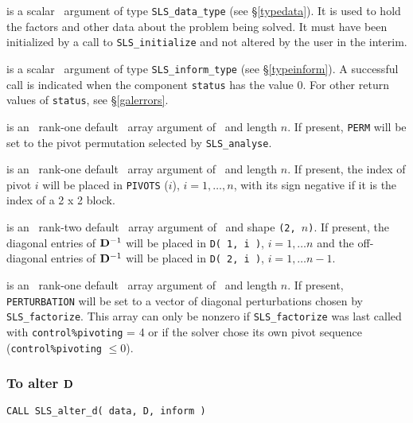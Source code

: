 \documentclass{galahad}
\newcommand{\packagename}{SLS}
\begin{document}
\begin{description}

 is a scalar \intentinout\ argument of type
{\tt \packagename\_data\_type}
(see \S\ref{typedata}). It is used to hold the factors and other
data about the problem being solved.
It must have been initialized by a call to
{\tt \packagename\_ini\-tialize} and not altered by the user in the interim.

 is a scalar \intentinout\ argument of type
{\tt \packagename\_inform\_type}
(see \S\ref{typeinform}).
A successful call is indicated when the  component {\tt status} has the value 0.
For other return values of {\tt status}, see \S\ref{galerrors}.

 is an \optional\ rank-one default \integer\ array argument
of \intentout\ and length $n$.
If present, {\tt PERM} will be set to the pivot permutation
selected by {\tt \packagename\_analyse}.

 is an \optional\ rank-one default \integer\ array argument
of \intentout\  and length $n$.
If present, the index of pivot $i$ will be placed in
{\tt PIVOTS} ($i$), $i = 1, \ldots, n$, with its sign negative if it is
the index of a 2 x 2 block.

 is an \optional\ rank-two default \realdp\ array argument
of \intentout\, and shape {\tt (2, $n$)}.
If present, the diagonal entries of ${\mathbf{D}}^{-1} $ will
be placed in {\tt D( 1, i )}, $i = 1, \ldots n$ and the off-diagonal
entries of ${\mathbf{D}}^{-1} $ will be placed in {\tt D( 2, i )},
$i = 1, \ldots n-1$.

 is an \optional\ rank-one default \realdp\ array argument
of \intentout\ and length $n$.
If present, {\tt PERTURBATION} will be set to a vector of diagonal perturbations
chosen by {\tt \packagename\_factorize}. This array can only be nonzero if
{\tt \packagename\_factorize} was last called with {\tt control\%pivoting} = 4
or if the solver chose its own pivot sequence ({\tt control\%pivoting} $\leq 0$).

\end{description}

\subsubsection{To alter ${\mathbf{D}}$}

\hskip0.5in
{\tt CALL \packagename\_alter\_d( data, D, inform )}
\end{document}
